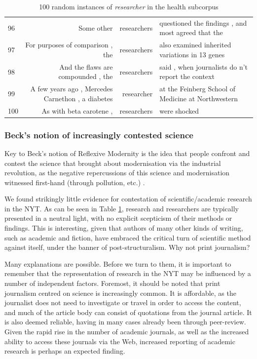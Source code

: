 {\begin{table}
\begin{tabular}{lrrl}
96 &  Some other                                         & researchers & questioned the findings , and most agreed that the \\
97 &  For purposes of comparison , the                   & researchers & also examined inherited variations in 13 genes     \\
98 &  And the flaws are compounded , the                 & researchers & said , when journalists do n't report the context  \\
99 &  A few years ago , Mercedes Carnethon , a diabetes  & researcher  & at the Feinberg School of Medicine at Northwestern \\
100 &  As with beta carotene ,                            & researchers & were shocked                                       \\
\end{tabular}
\caption{100 random instances of \emph{researcher} in the health subcorpus}
\label{tab:researcher}
\end{table}
\clearpage
}

\subsubsection{Beck's notion of increasingly contested science}

Key to Beck's notion of Reflexive Modernity is the idea that people confront and contest the science that brought about modernisation via the industrial revolution, as the negative repercussions of this science and modernisation witnessed first-hand (through pollution, etc.) \cite{ross_science_1996}. 

We found strikingly little evidence for contestation of scientific\slash academic research in the NYT. As can be seen in Table \ref{tab:researcher}, research and researchers are typically presented in a neutral light, with no explicit scepticism of their methods or findings. This is interesting, given that authors of many other kinds of writing, such as academic and fiction, have embraced the critical turn of scientific method against itself, under the banner of post-structuralism. Why not print journalism?

Many explanations are possible. Before we turn to them, it is important to remember that the representation of research in the NYT may be influenced by a number of independent factors. Foremost, it should be noted that print journalism centred on science is increasingly common. It is affordable, as the journalist does not need to investigate or travel in order to access the content, and much of the article body can consist of quotations from the journal article. It is also deemed reliable, having in many cases already been through peer-review. Given the rapid rise in the number of academic journals, as well as the increased ability to access these journals via the Web, increased reporting of academic research is perhaps an expected finding. 

